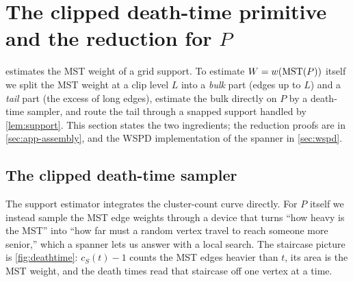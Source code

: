 \section{The clipped death-time primitive and the reduction for \texorpdfstring{$P$}{P}}\label{sec:dt}

 estimates the MST weight of a grid support. To estimate $W=w(\mathrm{MST}(P))$ itself we
split the MST weight at a clip level $L$ into a \emph{bulk} part (edges up to $L$) and a \emph{tail} part
(the excess of long edges), estimate the bulk directly on $P$ by a death-time sampler, and route the tail
through a snapped support handled by \cref{lem:support}. This section states the two ingredients; the
reduction proofs are in \cref{sec:app-assembly}, and the WSPD implementation of the spanner in
\cref{sec:wspd}.

\subsection{The clipped death-time sampler}\label{sec:dt-sampler}

The support estimator integrates the cluster-count curve directly. For $P$ itself we instead sample the
MST edge weights through a device that turns ``how heavy is the MST'' into ``how far must a random vertex
travel to reach someone more senior,'' which a spanner lets us answer with a local search. The staircase
picture is \cref{fig:deathtime}: $c_S(t)-1$ counts the MST edges heavier than $t$, its area is the MST
weight, and the death times read that staircase off one vertex at a time.

